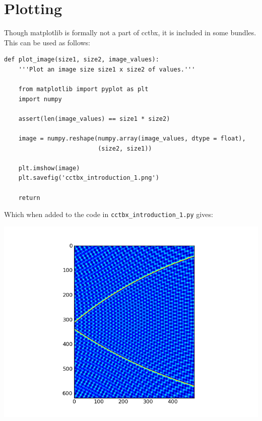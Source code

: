 \documentclass[a4paper, 11pt]{article}
\begin{document}
\section{Plotting}

Though matplotlib is formally not a part of cctbx, it is included in some bundles. This can be used as follows:

{\small
\begin{verbatim}
def plot_image(size1, size2, image_values):
    '''Plot an image size size1 x size2 of values.'''

    from matplotlib import pyplot as plt
    import numpy

    assert(len(image_values) == size1 * size2)

    image = numpy.reshape(numpy.array(image_values, dtype = float),
                          (size2, size1))

    plt.imshow(image)
    plt.savefig('cctbx_introduction_1.png')

    return
\end{verbatim}
}

\noindent
Which when added to the code in \verb|cctbx_introduction_1.py| gives:

\includegraphics[scale = 0.5]{cctbx_introduction_1.png}
\end{document}
